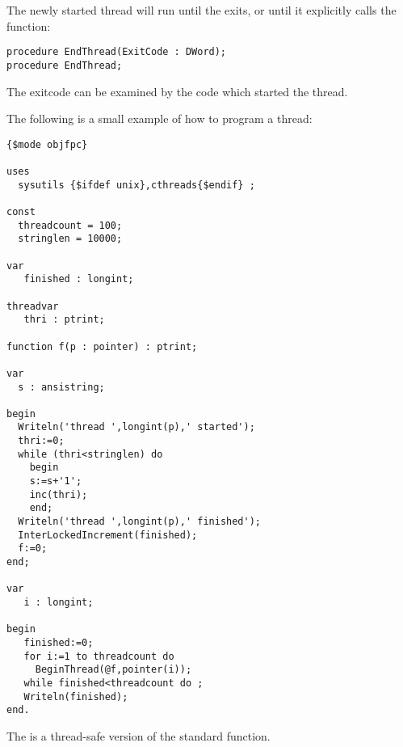 The newly started thread will run until the  exits, 
or until it explicitly calls the  function:
\begin{verbatim}
procedure EndThread(ExitCode : DWord);
procedure EndThread;
\end{verbatim}
The exitcode can be examined by the code which started the thread.

The following is a small example of how to program a thread:
\begin{verbatim}
{$mode objfpc}

uses
  sysutils {$ifdef unix},cthreads{$endif} ;

const
  threadcount = 100;
  stringlen = 10000;

var
   finished : longint;

threadvar
   thri : ptrint;

function f(p : pointer) : ptrint;

var
  s : ansistring;

begin
  Writeln('thread ',longint(p),' started');
  thri:=0;
  while (thri<stringlen) do
    begin
    s:=s+'1';
    inc(thri);
    end;
  Writeln('thread ',longint(p),' finished');
  InterLockedIncrement(finished);
  f:=0;
end;

var
   i : longint;

begin
   finished:=0;
   for i:=1 to threadcount do
     BeginThread(@f,pointer(i));
   while finished<threadcount do ;
   Writeln(finished);
end.

\end{verbatim}
The  is a thread-safe version of the standard  function.

